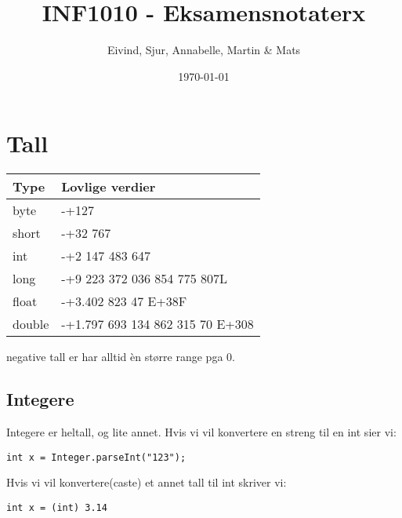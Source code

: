 \documentclass[11pt]{article}
\title{INF1010 - Eksamensnotaterx}
\author{Eivind, Sjur, Annabelle, Martin \& Mats}
\date{\today}
\begin{document}
\maketitle

\setcounter{tocdepth}{3}
\tableofcontents
\vspace*{1cm}
\section{Tall}
\label{sec-1}



\begin{center}
\begin{tabular}{ll}
\hline
 \textbf{Type}  &  \textbf{Lovlige verdier}          \\
\hline
 byte           &  -+127                             \\
\hline
 short          &  -+32 767                          \\
\hline
 int            &  -+2 147 483 647                   \\
\hline
 long           &  -+9 223 372 036 854 775 807L      \\
\hline
 float          &  -+3.402 823 47 E+38F              \\
\hline
 double         &  -+1.797 693 134 862 315 70 E+308  \\
\hline
\end{tabular}
\end{center}



  negative tall er har alltid èn større range pga 0. 
\subsection{Integere}
\label{sec-1-1}


   Integere er heltall, og lite annet.
   Hvis vi vil konvertere en streng til en int sier vi:

\begin{verbatim}
int x = Integer.parseInt("123");
\end{verbatim}
   Hvis vi vil konvertere(caste) et annet tall til int skriver vi:

\begin{verbatim}
int x = (int) 3.14
\end{verbatim}
\end{document}
